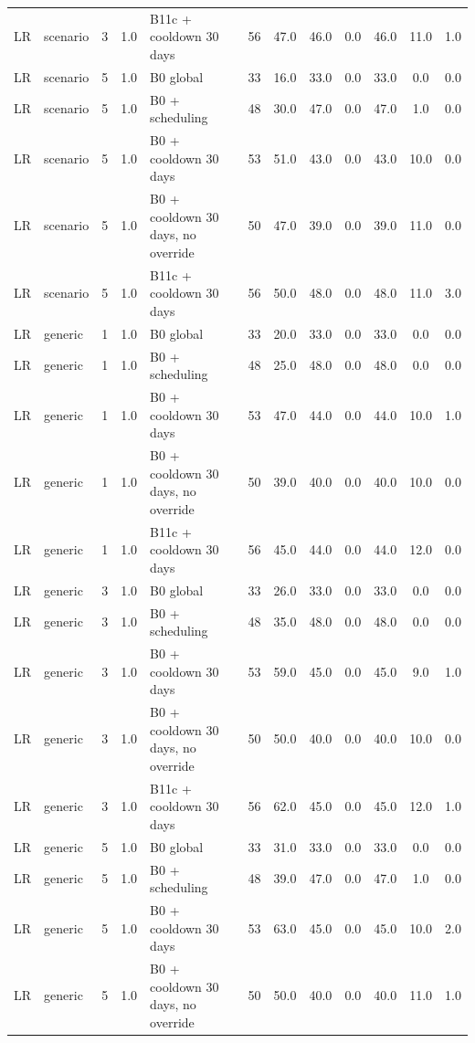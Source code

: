 \begin{longtable}{lllllccccccc}
LR & scenario & 3 & 1.0 & B11c + cooldown 30 days & 56 & 47.0 & 46.0 & 0.0 & 46.0 & 11.0 & 1.0 \\
LR & scenario & 5 & 1.0 & B0 global & 33 & 16.0 & 33.0 & 0.0 & 33.0 & 0.0 & 0.0 \\
LR & scenario & 5 & 1.0 & B0 + scheduling & 48 & 30.0 & 47.0 & 0.0 & 47.0 & 1.0 & 0.0 \\
LR & scenario & 5 & 1.0 & B0 + cooldown 30 days & 53 & 51.0 & 43.0 & 0.0 & 43.0 & 10.0 & 0.0 \\
LR & scenario & 5 & 1.0 & B0 + cooldown 30 days, no override & 50 & 47.0 & 39.0 & 0.0 & 39.0 & 11.0 & 0.0 \\
LR & scenario & 5 & 1.0 & B11c + cooldown 30 days & 56 & 50.0 & 48.0 & 0.0 & 48.0 & 11.0 & 3.0 \\
LR & generic & 1 & 1.0 & B0 global & 33 & 20.0 & 33.0 & 0.0 & 33.0 & 0.0 & 0.0 \\
LR & generic & 1 & 1.0 & B0 + scheduling & 48 & 25.0 & 48.0 & 0.0 & 48.0 & 0.0 & 0.0 \\
LR & generic & 1 & 1.0 & B0 + cooldown 30 days & 53 & 47.0 & 44.0 & 0.0 & 44.0 & 10.0 & 1.0 \\
LR & generic & 1 & 1.0 & B0 + cooldown 30 days, no override & 50 & 39.0 & 40.0 & 0.0 & 40.0 & 10.0 & 0.0 \\
LR & generic & 1 & 1.0 & B11c + cooldown 30 days & 56 & 45.0 & 44.0 & 0.0 & 44.0 & 12.0 & 0.0 \\
LR & generic & 3 & 1.0 & B0 global & 33 & 26.0 & 33.0 & 0.0 & 33.0 & 0.0 & 0.0 \\
LR & generic & 3 & 1.0 & B0 + scheduling & 48 & 35.0 & 48.0 & 0.0 & 48.0 & 0.0 & 0.0 \\
LR & generic & 3 & 1.0 & B0 + cooldown 30 days & 53 & 59.0 & 45.0 & 0.0 & 45.0 & 9.0 & 1.0 \\
LR & generic & 3 & 1.0 & B0 + cooldown 30 days, no override & 50 & 50.0 & 40.0 & 0.0 & 40.0 & 10.0 & 0.0 \\
LR & generic & 3 & 1.0 & B11c + cooldown 30 days & 56 & 62.0 & 45.0 & 0.0 & 45.0 & 12.0 & 1.0 \\
LR & generic & 5 & 1.0 & B0 global & 33 & 31.0 & 33.0 & 0.0 & 33.0 & 0.0 & 0.0 \\
LR & generic & 5 & 1.0 & B0 + scheduling & 48 & 39.0 & 47.0 & 0.0 & 47.0 & 1.0 & 0.0 \\
LR & generic & 5 & 1.0 & B0 + cooldown 30 days & 53 & 63.0 & 45.0 & 0.0 & 45.0 & 10.0 & 2.0 \\
LR & generic & 5 & 1.0 & B0 + cooldown 30 days, no override & 50 & 50.0 & 40.0 & 0.0 & 40.0 & 11.0 & 1.0 \\

\end{longtable}
